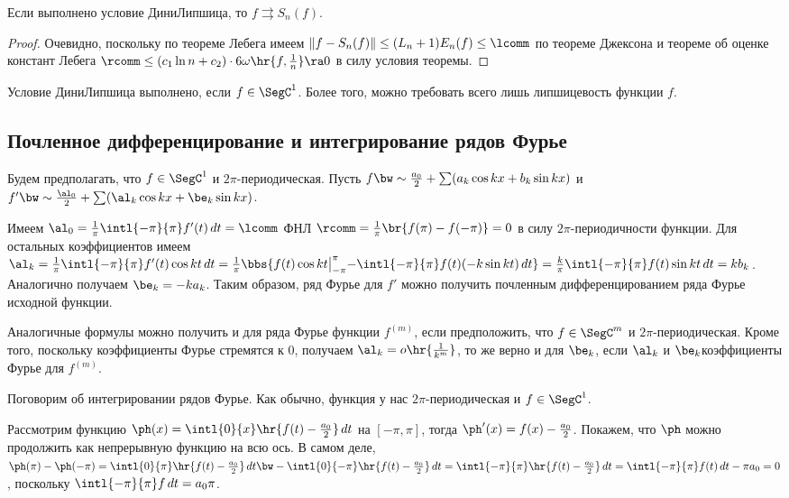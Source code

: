 \documentclass[a4paper]{article}
\newcommand{\intlop}{\intl{0}{\pi}}
\newcommand{\intlox}{\intl{0}{x}}
\newcommand{\intlpp}{\intl{-\pi}{\pi}}
\newcommand{\frpi}{\frac{1}{\pi}}
\newcommand{\sbs}[2]{\bigl|_{{#1}}^{{#2}}}
\begin{document}
\begin{theorem}
Если выполнено условие Дини\ч Липшица, то $f \rightrightarrows S_n(f)$.
\end{theorem}
\begin{proof}
Очевидно, поскольку по теореме Лебега имеем $\|f-S_n(f)\| \le (L_n+1)E_n(f) \le \lcomm$ по теореме Джексона и теореме об
оценке констант Лебега $\rcomm \le (c_1\ln n + c_2)\cdot 6\omega\hr{f,\frac{1}{n}} \ra 0$ в силу условия теоремы.
\end{proof}

\begin{note}
Условие Дини\ч Липшица выполнено, если $f \in\SegC^1$. Более того, можно требовать всего лишь липшицевость функции $f$.
\end{note}

\subsection{Почленное дифференцирование и интегрирование рядов Фурье}

Будем предполагать, что $f \in\SegC^1$ и $2\pi$-периодическая. Пусть $f \bw\sim \frac{a_0}{2} + \sum(a_k \cos kx + b_k \sin kx)$
и $f' \bw\sim \frac{\al_0}{2} + \sum (\al_k\cos kx + \be_k\sin kx)$.

Имеем $\al_0 = \frpi \intlpp f'(t)\,d t = \lcomm$ ФНЛ $\rcomm = \frpi \br{f(\pi)-f(-\pi)}=0$ в
силу $2\pi$-периодичности функции. Для остальных коэффициентов имеем $\al_k = \frpi \intlpp
f'(t)\cos kt \,d t = \frpi \bbs{f(t)\cos kt\sbs{-\pi}{\pi} - \intlpp f(t)(-k\sin kt)\,d t}=
\frac{k}{\pi}\intlpp f(t)\sin kt \,d t = k b_k$. Аналогично получаем $\be_k = -k a_k$. Таким
образом, ряд Фурье для $f'$ можно получить почленным дифференцированием ряда Фурье исходной
функции.

Аналогичные формулы можно получить и для ряда Фурье функции $f^{(m)}$, если предположить, что $f \in\SegC^m$ и $2\pi$-периодическая.
Кроме того, поскольку коэффициенты Фурье стремятся к 0, получаем $\al_k = o\hr{\frac{1}{k^m}}$, то же верно и для $\be_k$, если $\al_k$ и $\be_k$\т коэффициенты Фурье для $f^{(m)}$.

Поговорим об интегрировании рядов Фурье. Как обычно, функция у нас $2\pi$-периодическая и $f \in\SegC^1$.

Рассмотрим функцию $\ph(x) = \intlox\hr{f(t) -\frac{a_0}{2}}\,dt$ на $[-\pi,\pi]$, тогда $\ph'(x)
= f(x) - \frac{a_0}{2}$. Покажем, что $\ph$ можно продолжить как непрерывную функцию на всю ось. В
самом деле, $\ph(\pi)-\ph(-\pi)=\intlop \hr{f(t)-\frac{a_0}{2}}\,dt \bw-
\intl{0}{-\pi}\hr{f(t)-\frac{a_0}{2}}\,d t= \intlpp \hr{f(t)-\frac{a_0}{2}}\,dt = \intlpp
f(t)\,d t - \pi a_0 = 0$, поскольку $\intlpp f \,d t = a_0\pi$.
\end{document}
